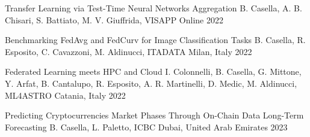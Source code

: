 



\begin{cvhonors}

  \cvhonor
    {Transfer Learning via Test-Time Neural Networks Aggregation} %
    {B. Casella, A. B. Chisari, S. Battiato, M. V. Giuffrida, VISAPP} %
    {Online} %
    {2022} %

  \cvhonor
    {Benchmarking FedAvg and FedCurv for Image Classification Tasks} %
    {B. Casella, R. Esposito, C. Cavazzoni, M. Aldinucci, ITADATA} %
    {Milan, Italy} %
    {2022} %

  \cvhonor
    {Federated Learning meets HPC and Cloud} %
    {I. Colonnelli, B. Casella, G. Mittone, Y. Arfat, B. Cantalupo, R. Esposito, A. R. Martinelli, D. Medic, M. Aldinucci, ML4ASTRO} %
    {Catania, Italy} %
    {2022} %

  \cvhonor
    {Predicting Cryptocurrencies Market Phases Through On-Chain Data Long-Term Forecasting} %
    {B. Casella, L. Paletto, ICBC} %
    {Dubai, United Arab Emirates} %
    {2023} %

\end{cvhonors}





